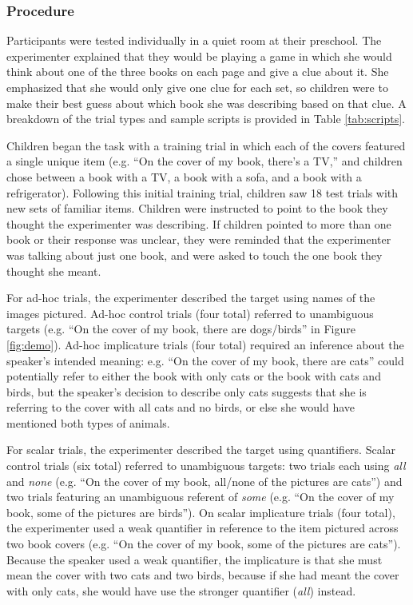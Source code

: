 \documentclass[10pt,letterpaper]{article}
\begin{document}
\subsubsection{Procedure}

Participants were tested individually in a quiet room at their preschool.  The experimenter explained that they would be playing a game in which she would think about one of the three books on each page and give a clue about it. She emphasized that she would only give one clue for each set, so children were to make their best guess about which book she was describing based on that clue. A breakdown of the trial types and sample scripts is provided in Table \ref{tab:scripts}.

Children began the task with a training trial in which each of the covers featured a single unique item (e.g. ``On the cover of my book, there's a TV,'' and children chose between a book with a TV, a book with a sofa, and a book with a refrigerator). Following this initial training trial, children saw 18 test trials with new sets of familiar items. Children were instructed to point to the book they thought the experimenter was describing. If children pointed to more than one book or their response was unclear, they were reminded that the experimenter was talking about just one book, and were asked to touch the one book they thought she meant.  

For ad-hoc trials, the experimenter described the target using names of the images pictured. Ad-hoc control trials (four total) referred to unambiguous targets (e.g. ``On the cover of my book, there are dogs/birds'' in Figure \ref{fig:demo}).  Ad-hoc implicature trials (four total) required an inference about the speaker's intended meaning: e.g. ``On the cover of my book, there are cats'' could potentially refer to either the book with only cats or the book with cats and birds, but the speaker's decision to describe only cats suggests that she is referring to the cover with all cats and no birds, or else she would have mentioned both types of animals. 

For scalar trials, the experimenter described the target using quantifiers. Scalar control trials (six total) referred to unambiguous targets: two trials each using \emph{all} and \emph{none} (e.g. ``On the cover of my book, all/none of the pictures are cats'') and two trials featuring an unambiguous referent of \emph{some} (e.g. ``On the cover of my book, some of the pictures are birds'').  On scalar implicature trials (four total), the experimenter used a weak quantifier in reference to the item pictured across two book covers (e.g. ``On the cover of my book, some of the pictures are cats''). Because the speaker used a weak quantifier, the implicature is that she must mean the cover with two cats and two birds, because if she had meant the cover with only cats, she would have use the stronger quantifier (\emph{all}) instead. 
\end{document}
